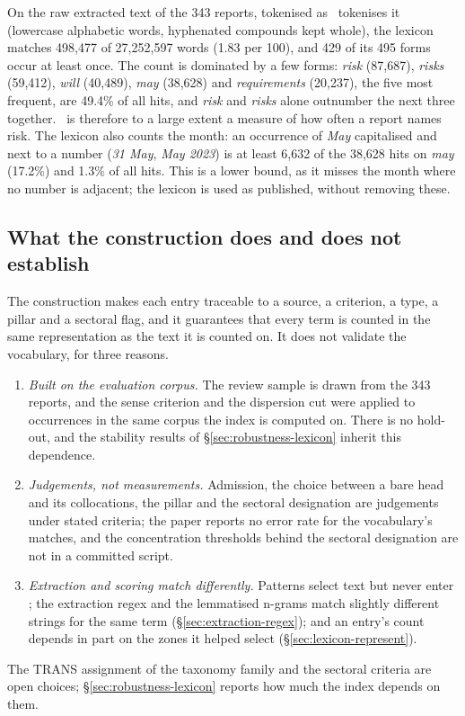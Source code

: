 On the raw extracted text of the 343 reports, tokenised as \HEDGE\ tokenises
it (lowercase alphabetic words, hyphenated compounds kept whole), the lexicon matches 498,477 of 27,252,597 words (1.83 per
100), and 429 of its 495 forms occur at least once. The count is dominated by
a few forms: \emph{risk} (87,687), \emph{risks} (59,412), \emph{will}
(40,489), \emph{may} (38,628) and \emph{requirements} (20,237), the five most
frequent, are 49.4\% of all hits, and \emph{risk} and \emph{risks} alone
outnumber the next three together. \HEDGE\ is therefore to a large extent a
measure of how often a report names risk. The
lexicon also counts the month: an occurrence of \emph{May} capitalised and next
to a number (\emph{31 May}, \emph{May 2023}) is at least 6,632 of the 38,628
hits on \emph{may} (17.2\%) and 1.3\% of all hits. This is a lower bound, as
it misses the month where no number is adjacent; the lexicon is used as
published, without removing these.

\subsection{What the construction does and does not establish}
\label{sec:lexicon-limits}

The construction makes each entry traceable to a source, a criterion, a type,
a pillar and a sectoral flag, and it guarantees that every term is counted in
the same representation as the text it is counted on. It does not validate the
vocabulary, for three reasons.
\begin{enumerate}
\item \emph{Built on the evaluation corpus.} The review sample is drawn from
  the 343 reports, and the sense criterion and the dispersion cut were applied
  to occurrences in the same corpus the index is computed on. There is no
  hold-out, and the stability results of \S\ref{sec:robustness-lexicon} inherit
  this dependence.
\item \emph{Judgements, not measurements.} Admission, the choice between a
  bare head and its collocations, the pillar and the sectoral designation are
  judgements under stated criteria; the paper reports no error rate for the
  vocabulary's matches, and the concentration thresholds behind the sectoral
  designation are not in a committed script.
\item \emph{Extraction and scoring match differently.} Patterns select text but
  never enter \SUS; the extraction regex and the lemmatised n-grams match
  slightly different strings for the same term
  (\S\ref{sec:extraction-regex}); and an entry's count depends in part on the
  zones it helped select (\S\ref{sec:lexicon-represent}).
\end{enumerate}
The TRANS assignment of the taxonomy family and the sectoral criteria are open
choices; \S\ref{sec:robustness-lexicon} reports how much the index depends on
them.
